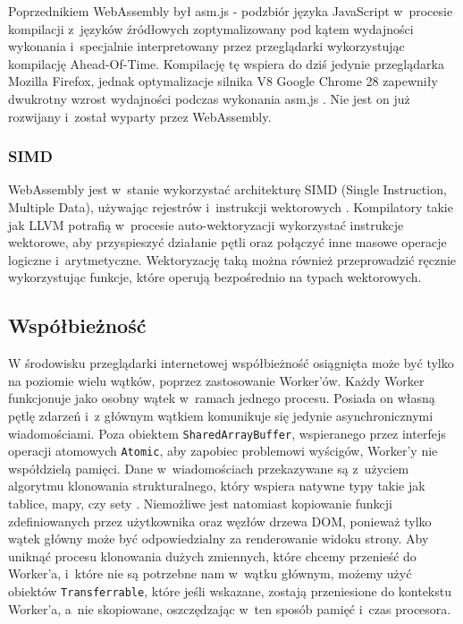 Poprzednikiem WebAssembly był asm.js - podzbiór języka JavaScript w~procesie kompilacji z~języków źródłowych zoptymalizowany pod kątem wydajności wykonania i~specjalnie interpretowany przez przeglądarki wykorzystując kompilację Ahead-Of-Time. Kompilację tę wspiera do dziś jedynie przeglądarka Mozilla Firefox, jednak optymalizacje silnika V8 Google Chrome 28 zapewniły dwukrotny wzrost wydajności podczas wykonania asm.js \cite{asm.js-chrome}. Nie jest on już rozwijany i~został wyparty przez WebAssembly.

\subsubsection{SIMD}

WebAssembly jest w~stanie wykorzystać architekturę SIMD (Single Instruction, Multiple Data), używając rejestrów i~instrukcji wektorowych \cite{wasm-simd}. Kompilatory takie jak LLVM potrafią w~procesie auto-wektoryzacji wykorzystać instrukcje wektorowe, aby przyspieszyć działanie pętli oraz połączyć inne masowe operacje logiczne i~arytmetyczne. Wektoryzację taką można również przeprowadzić ręcznie wykorzystując funkcje, które operują bezpośrednio na typach wektorowych.

\subsection{Współbieżność}

W środowisku przeglądarki internetowej współbieżność osiągnięta może być tylko na poziomie wielu wątków, poprzez zastosowanie Worker'ów. Każdy Worker funkcjonuje jako osobny wątek w~ramach jednego procesu. Posiada on własną pętlę zdarzeń i~z głównym wątkiem komunikuje się jedynie asynchronicznymi wiadomościami. Poza obiektem \lstinline{SharedArrayBuffer}, wspieranego przez interfejs operacji atomowych \lstinline{Atomic}, aby zapobiec problemowi wyścigów, Worker'y nie współdzielą pamięci. Dane w~wiadomościach przekazywane są z~użyciem algorytmu klonowania strukturalnego, który wspiera natywne typy takie jak tablice, mapy, czy sety \cite{structured-clone}. Niemożliwe jest natomiast kopiowanie funkcji zdefiniowanych przez użytkownika oraz węzłów drzewa DOM, ponieważ tylko wątek główny może być odpowiedzialny za renderowanie widoku strony. Aby uniknąć procesu klonowania dużych zmiennych, które chcemy przenieść do Worker'a, i~które nie są potrzebne nam w~wątku głównym, możemy użyć obiektów \lstinline{Transferrable}, które jeśli wskazane, zostają przeniesione do kontekstu Worker'a, a~nie skopiowane, oszczędzając w~ten sposób pamięć i~czas procesora.


